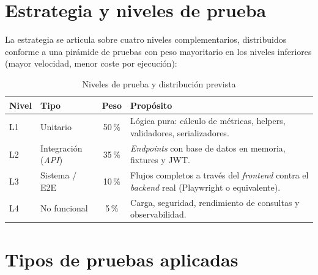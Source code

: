 \section{Estrategia y niveles de prueba}
\label{sec:anx-pruebas-estrategia}

La estrategia se articula sobre cuatro niveles complementarios, distribuidos
conforme a una pirámide de pruebas con peso mayoritario en los niveles
inferiores (mayor velocidad, menor coste por ejecución):

\begin{table}[H]
  \centering
  \small
  \caption{Niveles de prueba y distribución prevista}
  \label{tab:niveles-prueba}
  \begin{tabularx}{\textwidth}{l l c X}
    \toprule
    \textbf{Nivel} & \textbf{Tipo} & \textbf{Peso} & \textbf{Propósito} \\
    \midrule
    L1 & Unitario               & 50\,\% &
      Lógica pura: cálculo de métricas, helpers, validadores, serializadores. \\
    L2 & Integración (\emph{API}) & 35\,\% &
      \emph{Endpoints} con base de datos en memoria, fixtures y \acs{JWT}. \\
    L3 & Sistema / E2E          & 10\,\% &
      Flujos completos a través del \emph{frontend} contra el \emph{backend}
      real (Playwright o equivalente). \\
    L4 & No funcional           &  5\,\% &
      Carga, seguridad, rendimiento de consultas y observabilidad. \\
    \bottomrule
  \end{tabularx}
\end{table}


\section{Tipos de pruebas aplicadas}
\label{sec:anx-pruebas-tipos}

